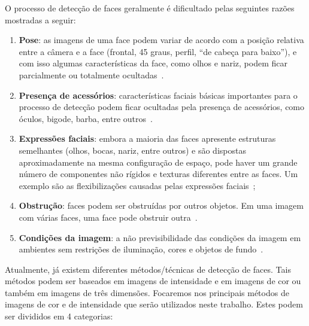 O processo de detecção de faces geralmente é dificultado pelas seguintes razões mostradas a seguir:

	\begin{enumerate}
		\item \textbf{Pose}: as imagens de uma face podem variar de acordo com a posição relativa entre a câmera e a face (frontal, 45 graus, perfil, ``de cabeça para baixo''), e com isso algumas características da face, como olhos e nariz, podem ficar parcialmente ou totalmente ocultadas~\cite{yang}.
		\item \textbf{Presença de acessórios}: características faciais básicas importantes para o processo de detecção podem ficar ocultadas pela presença de acessórios, como óculos, bigode, barba, entre outros~\cite{oliveira, yang}. 
		\item \textbf{Expressões faciais}: embora a maioria das faces apresente estruturas semelhantes (olhos, bocas, nariz, entre outros) e são dispostas aproximadamente na mesma configuração de espaço, pode haver um grande número de componentes não rígidos e texturas diferentes entre as faces. Um exemplo são as flexibilizações causadas pelas expressões faciais~\cite{oliveira, yang};
		\item \textbf{Obstrução}: faces podem ser obstruídas por outros objetos. Em uma imagem com várias faces, uma face pode obstruir outra~\cite{yang}.
		\item \textbf{Condições da imagem}: a não previsibilidade das condições da imagem em ambientes sem restrições de iluminação, cores e objetos de fundo~\cite{oliveira, yang}.
	\end{enumerate}

Atualmente, já existem diferentes métodos/técnicas de detecção de faces. Tais métodos podem ser baseados em imagens de intensidade e em imagens de cor ou também em imagens de três dimensões. Focaremos nos principais métodos de imagens de cor e de intensidade que serão utilizados neste trabalho. Estes podem ser divididos em 4 categorias:

